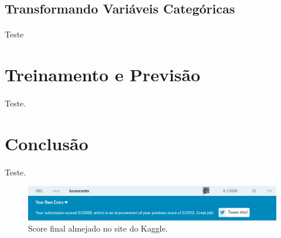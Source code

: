 \documentclass{article}
\begin{document}
		\subsection{Transformando Variáveis Categóricas}
			\paragraph{}Teste
		
		
\section{Treinamento e Previsão}
	\paragraph{}Teste.
	
\section{Conclusão}

	\paragraph{}Teste.
	
	\begin{figure}[H]
		\centering
		\includegraphics[scale=0.6]{../img/final_score}
		\caption{Score final almejado no site do Kaggle.}
	\end{figure}
\end{document}
